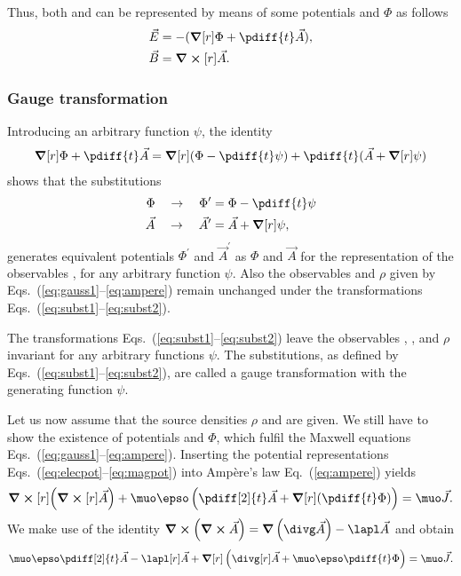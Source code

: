 \documentclass[10pt,a4paper]{article}
\newcommand*{\Eq}[1]{Eq.~(#1)}
\newcommand*{\Eqs}[1]{Eqs.~(#1)}
\begin{document}
Thus, both  and  can be represented by means of some potentials
 and $\Phi$ as follows
\begin{align}
\vec{E}&=-(\grad[r]\Phi+\pdiff{t}\vec{A}),\label{eq:elecpot}\\
\vec{B}&=\curl[r]\vec{A}.\label{eq:magpot}
\end{align}

\subsubsection{Gauge transformation}
Introducing an arbitrary function $\psi$, the identity
\begin{align}
\grad[r]{\Phi}+\pdiff{t}\vec{A}=
\grad[r]{(\Phi-\pdiff{t}\psi)}+\pdiff{t}(\vec{A}+\grad[r]{\psi})
\end{align}
shows that the substitutions
\begin{align}
\Phi\quad\rightarrow\quad
\Phi^\prime  & = \Phi-\pdiff{t}\psi\label{eq:subst1}\\
\vec{A}\quad\rightarrow\quad
\vec{A}^\prime & = \vec{A} + \grad[r]{\psi},\label{eq:subst2}
\end{align}
generates equivalent potentials $\Phi^\prime$ and $\vec{A}^\prime$ as 
$\Phi$ and $\vec{A}$ for the representation of the observables
,  for any arbitrary function $\psi$. 
Also the observables  and $\rho$  given by
\Eqs{\ref{eq:gauss1}--\ref{eq:ampere}} remain unchanged under the
transformations \Eqs{\ref{eq:subst1}--\ref{eq:subst2}}.

The transformations \Eqs{\ref{eq:subst1}--\ref{eq:subst2}} leave 
the observables , ,  and 
$\rho$ invariant for any arbitrary functions $\psi$. 
The substitutions, as defined by \Eqs{\ref{eq:subst1}--\ref{eq:subst2}},
are called a gauge transformation with the generating function $\psi$.

Let us now assume that the source densities $\rho$ and  are given. 
We still have to show the existence of potentials   and $\Phi$, 
which fulfil the Maxwell equations \Eqs{\ref{eq:gauss1}--\ref{eq:ampere}}.
Inserting the potential representations \Eqs{\ref{eq:elecpot}--\ref{eq:magpot}}
into Ampère's law \Eq{\ref{eq:ampere}} yields 
\begin{align}
\curl[r]{\left(\curl[r]{\vec{A}}\right)} + 
\muo\epso\left(\pdiff[2]{t}\vec{A}+\grad[r]{\left(\pdiff{t}\Phi\right)}\right)
= \muo\vec{J}.
\end{align}
We make use of the identity 
$\curl\left(\curl\vec{A}\right)=\grad\left(\divg\vec{A}\right)-\lapl\vec{A}$
and obtain
\begin{align}
\muo\epso\pdiff[2]{t}\vec{A} - \lapl[r]\vec{A} + 
\grad[r]\left(\divg[r]\vec{A} + \muo\epso\pdiff{t}\Phi\right) = 
\muo\vec{J}.\label{eq:amperealt}
\end{align}
\end{document}
